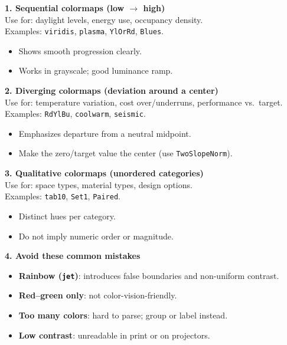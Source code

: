 \begin{tcolorbox}[
  title=Colormap selection guidelines,
  colframe=blue,
  colback=white,
  arc=2mm,
  breakable
]
\textbf{1. Sequential colormaps (low $\rightarrow$ high)}\\
Use for: daylight levels, energy use, occupancy density.\\
Examples: \texttt{viridis}, \texttt{plasma}, \texttt{YlOrRd}, \texttt{Blues}.
\begin{itemize}
  \item Shows smooth progression clearly.
  \item Works in grayscale; good luminance ramp.
\end{itemize}

\medskip
\textbf{2. Diverging colormaps (deviation around a center)}\\
Use for: temperature variation, cost over/underruns, performance vs.\ target.\\
Examples: \texttt{RdYlBu}, \texttt{coolwarm}, \texttt{seismic}.
\begin{itemize}
  \item Emphasizes departure from a neutral midpoint.
  \item Make the zero/target value the center (use \texttt{TwoSlopeNorm}).
\end{itemize}

\medskip
\textbf{3. Qualitative colormaps (unordered categories)}\\
Use for: space types, material types, design options.\\
Examples: \texttt{tab10}, \texttt{Set1}, \texttt{Paired}.
\begin{itemize}
  \item Distinct hues per category.
  \item Do not imply numeric order or magnitude.
\end{itemize}

\medskip
\textbf{4. Avoid these common mistakes}
\begin{itemize}
  \item \textbf{Rainbow (\texttt{jet})}: introduces false boundaries and non-uniform contrast.
  \item \textbf{Red--green only}: not color-vision-friendly.
  \item \textbf{Too many colors}: hard to parse; group or label instead.
  \item \textbf{Low contrast}: unreadable in print or on projectors.
\end{itemize}


\end{tcolorbox}
